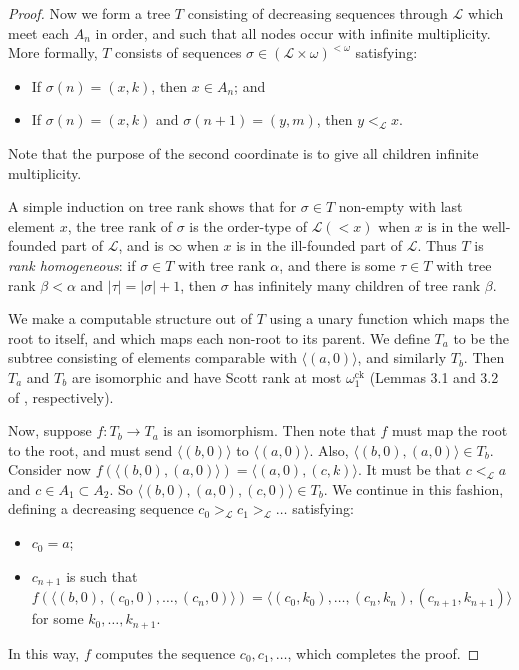 \documentclass[10pt,a4paper]{amsart}
\newcommand\+[1]{\mathcal{#1}}
\renewcommand\*[1]{\mathbf{#1}}
\renewcommand\=[1]{\text{#1}}
\renewcommand\*[1]{\mathbf{#1}}
\newcommand{\ock}{\omega_{1}^{\mathrm{ck}}}
\begin{document}
\begin{proof}
Now we form a tree $T$ consisting of decreasing sequences through $\+L$ which meet each $A_n$ in order, and such that all nodes occur with infinite multiplicity.  More formally, $T$ consists of sequences $\sigma \in (\+L \times \omega)^{<\omega}$ satisfying:
\begin{itemize}
\item If $\sigma(n) = (x, k)$, then $x \in A_n$; and
\item If $\sigma(n) = (x, k)$ and $\sigma(n+1) = (y, m)$, then $y <_{\+L} x$.
\end{itemize}
Note that the purpose of the second coordinate is to give all children infinite multiplicity.

A simple induction on tree rank shows that for $\sigma \in T$ non-empty with last element $x$, the tree rank of $\sigma$ is the order-type of $\+L(< x)$ when $x$ is in the well-founded part of $\+L$, and is $\infty$ when $x$ is in the ill-founded part of $\+L$.  Thus $T$ is {\em rank homogeneous}: if $\sigma \in T$ with tree rank $\alpha$, and there is some $\tau \in T$ with tree rank $\beta < \alpha$ and $|\tau| = |\sigma|+1$, then $\sigma$ has infinitely many children of tree rank $\beta$.

We make a computable structure out of $T$ using a unary function which maps the root to itself, and which maps each non-root to its parent.  We define $T_a$ to be the subtree consisting of elements comparable with $\langle (a, 0)\rangle$, and similarly $T_b$.  Then $T_a$ and $T_b$ are isomorphic and have Scott rank at most $\ock$ (Lemmas 3.1 and 3.2 of \cite{ckm06}, respectively).

Now, suppose $f: T_b \to T_a$ is an isomorphism.  Then note that $f$ must map the root to the root, and must send $\langle (b,0)\rangle$ to $\langle (a,0) \rangle$.  Also, $\langle (b, 0), (a, 0)\rangle \in T_b$.  Consider now $f( \langle (b, 0), (a,0) \rangle) = \langle (a, 0), (c,k) \rangle$.  It must be that $c <_{\+L} a$ and $c \in A_1 \subset A_2$.  So $\langle (b, 0), (a, 0), (c, 0)\rangle \in T_b$.  We continue in this fashion, defining a decreasing sequence $c_0 >_{\+L} c_1 >_{\+L} \dots$ satisfying:
\begin{itemize}
\item $c_0 = a$;
\item $c_{n+1}$ is such that $f(\langle (b, 0), (c_0,0), \dots, (c_n, 0)\rangle) = \langle (c_0,k_0), \dots, (c_n, k_n), (c_{n+1}, k_{n+1})\rangle$ for some $k_0, \dots, k_{n+1}$.
\end{itemize}
In this way, $f$ computes the sequence $c_0, c_1, \dots$, which completes the proof.
\end{proof}
\end{document}
